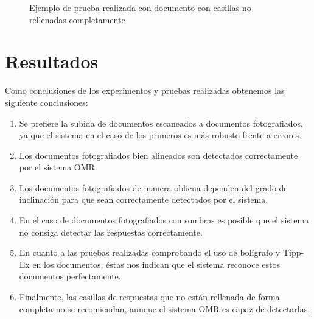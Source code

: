 \documentclass[a4paper, 12pt]{book}
\begin{document}
\begin{figure}
  \centering
  \caption{Ejemplo de prueba realizada con documento con casillas no rellenadas completamente}
  \label{figura:test6}
\end{figure}

\section{Resultados}
\label{sec:resultados}

Como conclusiones de los experimentos y pruebas realizadas obtenemos las
siguiente conclusiones:

\begin{enumerate}
  \item Se prefiere la subida de documentos escaneados a documentos fotografiados,
  ya que el sistema en el caso de los primeros es más robusto frente a errores. 
  \item Los documentos fotografiados bien alineados son detectados correctamente
  por el sistema OMR.
  \item Los documentos fotografiados de manera oblicua dependen del grado de inclinación
  para que sean correctamente detectados por el sistema.
  \item En el caso de documentos fotografiados con sombras es posible que el sistema no
  consiga detectar las respuestas correctamente.
  \item En cuanto a las pruebas realizadas comprobando el uso de bolígrafo y Tipp-Ex en
  los documentos, éstas nos indican que el sistema reconoce estos documentos perfectamente.
  \item Finalmente, las casillas de respuestas que no están rellenada de forma completa
  no se recomiendan, aunque el sistema OMR es capaz de detectarlas.
\end{enumerate}
\end{document}
